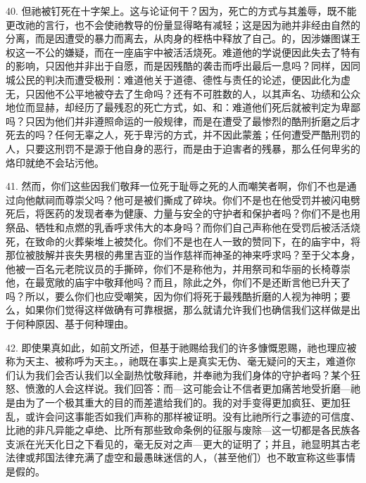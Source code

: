 40. 但祂被钉死在十字架上。这与论证何干？因为，死亡的方式与其羞辱，既不能更改祂的言行，也不会使祂教导的份量显得略有减轻；这是因为祂并非经由自然的分离，而是因遭受的暴力而离去，从肉身的桎梏中释放了自己。的，因涉嫌图谋王权这一不公的嫌疑，而在一座庙宇中被活活烧死。难道他的学说便因此失去了特有的影响，只因他并非出于自愿，而是因残酷的袭击而呼出最后一息吗？同样，因同城公民的判决而遭受极刑：难道他关于道德、德性与责任的论述，便因此化为虚无，只因他不公平地被夺去了生命吗？还有不可胜数的人，以其声名、功绩和公众地位而显赫，却经历了最残忍的死亡方式，如、和：难道他们死后就被判定为卑鄙吗？只因为他们并非遵照命运的一般规律，而是在遭受了最惨烈的酷刑折磨之后才死去的吗？任何无辜之人，死于卑污的方式，并不因此蒙羞；任何遭受严酷刑罚的人，只要这刑罚不是源于他自身的恶行，而是由于迫害者的残暴，那么任何卑劣的烙印就绝不会玷污他。\par

41. 然而，你们这些因我们敬拜一位死于耻辱之死的人而嘲笑者啊，你们不也是通过向他献祠而尊崇父吗？他可是被们撕成了碎块。你们不是也在他受罚并被闪电劈死后，将医药的发现者奉为健康、力量与安全的守护者和保护者吗？你们不是也用祭品、牺牲和点燃的乳香呼求伟大的本身吗？而你们自己声称他在受罚后被活活烧死，在致命的火葬柴堆上被焚化。你们不是也在人一致的赞同下，在的庙宇中，将那位被肢解并丧失男根的弗里吉亚的当作慈祥而神圣的神来呼求吗？至于父本身，他被一百名元老院议员的手撕碎，你们不是称他为，并用祭司和华丽的长椅尊崇他，在最宽敞的庙宇中敬拜他吗？而且，除此之外，你们不是还断言他已升天了吗？所以，要么你们也应受嘲笑，因为你们将死于最残酷折磨的人视为神明；要么，如果你们觉得这样做确有可靠根据，那么就请允许我们也确信我们这样做是出于何种原因、基于何种理由。\par

42. 即使果真如此，如前文所述，但基于祂赐给我们的许多慷慨恩赐，祂也理应被称为天主、被称呼为天主。，祂既在事实上是真实无伪、毫无疑问的天主，难道你们认为我们会否认我们以全副热忱敬拜祂，并奉祂为我们身体的守护者吗？某个狂怒、愤激的人会这样说。我们回答：而---这可能会让不信者更加痛苦地受折磨---祂是由为了一个极其重大的目的而差遣给我们的。我的对手变得更加疯狂、更加狂乱，或许会问这事能否如我们声称的那样被证明。没有比祂所行之事迹的可信度、比祂的非凡异能之卓绝、比所有那些致命条例的征服与废除---这一切都是各民族各支派在光天化日之下看见的，毫无反对之声---更大的证明了；并且，祂显明其古老法律或邦国法律充满了虚空和最愚昧迷信的人，（甚至他们）也不敢宣称这些事情是假的。\par

